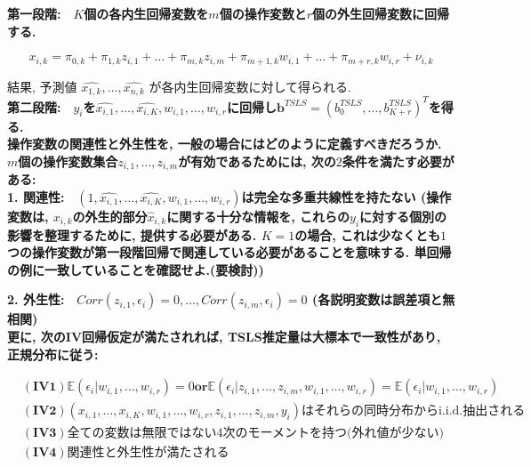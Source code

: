 \documentclass[paper=a4paper,fontsize=10pt]{jlreq}
\begin{document}
\rmfamily\mcfamily\bfseries{第一段階}\mdseries :　$K$個の各内生回帰変数を$m$個の操作変数と$r$個の外生回帰変数に回帰する.

\begin{equation*}
  x_{i,k} = \pi_{0,k} + \pi_{1,k}z_{i,1} + \dots + \pi_{m,k}z_{i,m} + \pi_{m+1,k}w_{i,1} + \dots + \pi_{m+r,k}w_{i,r} + \nu_{i,k}
\end{equation*}

結果, 予測値 $\hat{x_{1,k}}, \dots, \hat{x_{n,k}}$ が各内生回帰変数に対して得られる.\\

\rmfamily\mcfamily\bfseries{第二段階}\mdseries :　$y_i$を$\hat{x_{i,1}}, \dots, \hat{x_{i,K}}, w_{i,1}, \dots, w_{i,r}$に回帰し$\mathbf{b}^{TSLS} = (b_0^{TSLS}, \dots, b_{K+r}^{TSLS})^T$を得る.\\

操作変数の\rmfamily\mcfamily\bfseries{関連性と外生性}\mdseries を, 一般の場合にはどのように定義すべきだろうか. $m$個の操作変数集合$z_{i,1}, \dots, z_{i,m}$が有効であるためには, 次の$2$条件を満たす必要がある:\\

\rmfamily\mcfamily\bfseries{1. 関連性}\mdseries :　$(1, \hat{x_{i,1}}, \dots, \hat{x_{i,K}}, w_{i,1}, \dots, w_{i,r})$は完全な多重共線性を持たない (操作変数は, $x_{i,k}$の外生的部分$\hat{x}_{i,k}$に関する十分な情報を, これらの$y_i$に対する個別の影響を整理するために, 提供する必要がある. $K = 1$の場合, これは少なくとも$1$つの操作変数が第一段階回帰で関連している必要があることを意味する. 単回帰の例に一致していることを確認せよ.(要検討))

\rmfamily\mcfamily\bfseries{2. 外生性}\mdseries :　$Corr(z_{i,1}, \epsilon_i) = 0, \dots, Corr(z_{i,m}, \epsilon_i) = 0$ (各説明変数は誤差項と無相関)\\

更に, 次のIV回帰仮定が満たされれば, TSLS推定量は大標本で一致性があり, 正規分布に従う:

\begin{align*}
  &\mathbf{(IV1)}　\mathbb{E}(\epsilon_i|w_{i,1}, \dots, w_{i,r})=0　\mathbf{or}　\mathbb{E}(\epsilon_i|z_{i,1}, \dots, z_{i,m}, w_{i,1}, \dots, w_{i,r}) = \mathbb{E}(\epsilon_i|w_{i,1}, \dots, w_{i,r})\\
  &\mathbf{(IV2)}　(x_{i,1}, \dots, x_{i,K}, w_{i,1}, \dots, w_{i,r}, z_{i,1}, \dots, z_{i,m}, y_i) \text{はそれらの同時分布からi.i.d.抽出される}\\
  &\mathbf{(IV3)}　\text{全ての変数は無限ではない4次のモーメントを持つ(外れ値が少ない)}\\
  &\mathbf{(IV4)}　\text{関連性と外生性が満たされる}
\end{align*}
\end{document}
